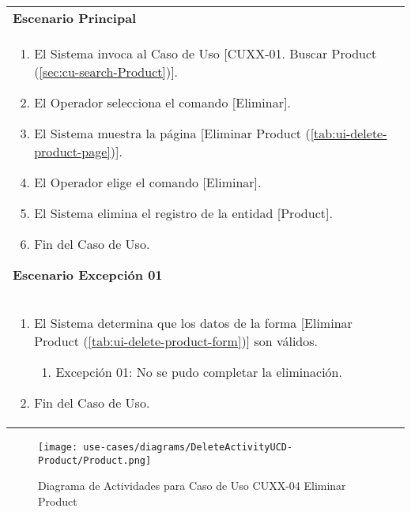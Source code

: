 	\begin{tabular}{ p{15.5cm} }
		\textbf{Escenario Principal} \\
		\begin{enumerate}
			\item El Sistema invoca al Caso de Uso [CUXX-01. Buscar Product (\ref{sec:cu-search-Product})].
			\item El Operador selecciona el comando [Eliminar].
			\item El Sistema muestra la p\'agina [Eliminar Product (\ref{tab:ui-delete-product-page})].
			\item El Operador elige el comando [Eliminar].
			\item El Sistema elimina el registro de la entidad [Product].
			\item Fin del Caso de Uso.
		\end{enumerate}
		\textbf{Escenario Excepci\'on 01} \\
		\begin{enumerate}
		   \item El Sistema determina que los datos de la forma [Eliminar Product (\ref{tab:ui-delete-product-form})] son v\'alidos.
		   	\begin{enumerate}
		   		\item Excepci\'on 01: No se pudo completar la eliminaci\'on.
		    \end{enumerate}
		   \item Fin del Caso de Uso.
		\end{enumerate}
	\end{tabular}
	
	\begin{figure}[H]
	  \begin{center}
		 \label{tab:activity-delete-ucd-entity-product}
		 \texttt{[image: use-cases/diagrams/DeleteActivityUCD-Product/Product.png]}
		 \caption{Diagrama de Actividades para Caso de Uso CUXX-04 Eliminar Product}
	  \end{center}
	\end{figure}
	
